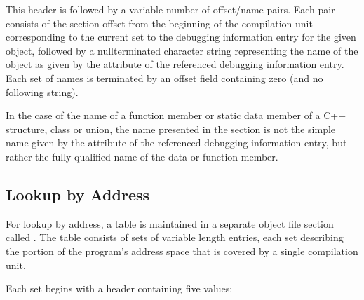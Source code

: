 This header is followed by a variable number of offset/name
pairs. Each pair consists of the section offset from the
beginning of the compilation unit corresponding to the current
set to the debugging information entry for the given object,
followed by a null\dash terminated character string representing
the name of the object as given by the  attribute
of the referenced debugging information entry. Each set of
names is terminated by an offset field containing zero (and
no following string).


In the case of the name of a function member or static data
member of a C++ structure, class or union, the name presented
in the 
section is not the simple name given
by the  attribute of the referenced debugging
information entry, but rather the fully qualified name of
the data or function member.

\subsection{Lookup by Address}

For lookup by address, a table is maintained in a separate
object file section called 
. The table consists
of sets of variable length entries, each set describing the
portion of the program’s address space that is covered by
a single compilation unit.

Each set begins with a header containing five values:

